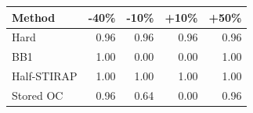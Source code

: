 \begin{tabular}{lrrrr}
\toprule
Method & -40\% & -10\% & +10\% & +50\% \\
\midrule
Hard & 0.96 & 0.96 & 0.96 & 0.96 \\
BB1 & 1.00 & 0.00 & 0.00 & 1.00 \\
Half-STIRAP & 1.00 & 1.00 & 1.00 & 1.00 \\
Stored OC & 0.96 & 0.64 & 0.00 & 0.96 \\
\bottomrule
\end{tabular}